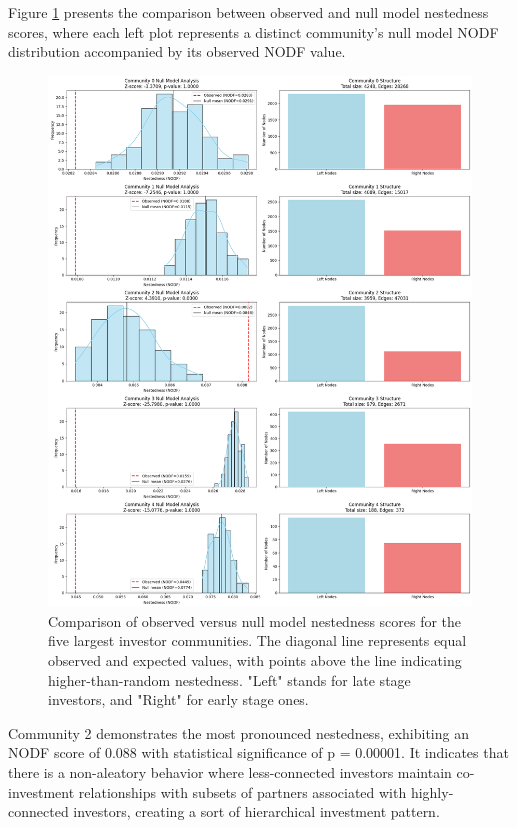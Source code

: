 Figure \ref{fig:nestedness_comparison} presents the comparison between observed and null model nestedness scores, where each left plot represents a distinct community's null model NODF distribution accompanied by its observed NODF value.

\begin{figure}[htp]
\centering
\includegraphics[width=1\textwidth]{./assets/null-model-analysis-top-5.png}
\caption{Comparison of observed versus null model nestedness scores for the five largest investor communities. The diagonal line represents equal observed and expected values, with points above the line indicating higher-than-random nestedness. "Left" stands for late stage investors, and "Right" for early stage ones.}
\label{fig:nestedness_comparison}
\end{figure}

\newcommand{\interestingCommunity}{2}
\newcommand{\interestingCommunityNODF}{0.088}
\newcommand{\interestingCommunityPValue}{0.00001}

Community \interestingCommunity{} demonstrates the most pronounced nestedness, exhibiting an NODF score of \interestingCommunityNODF{} with statistical significance of p = \interestingCommunityPValue{}. It indicates that there is a non-aleatory behavior where less-connected investors maintain co-investment relationships with subsets of partners associated with highly-connected investors, creating a sort of hierarchical investment pattern.

